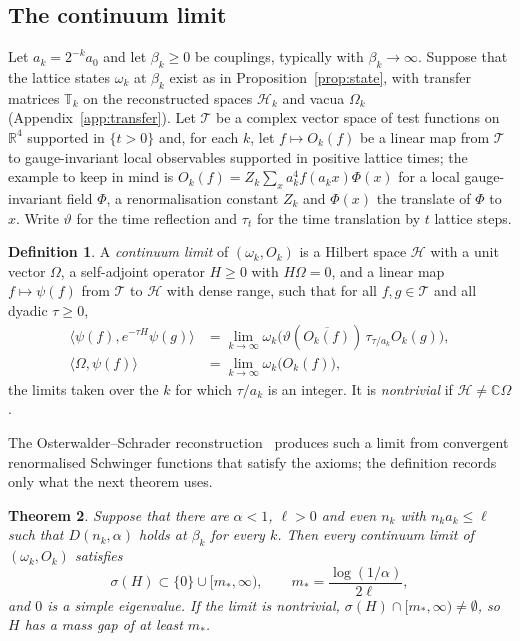 \documentclass[aps,prd,twocolumn,superscriptaddress,nofootinbib,longbibliography,floatfix,amsmath,amssymb,10pt]{revtex4-2}
\newtheorem{theorem}{Theorem}
\theoremstyle{definition}
\newtheorem{definition}[theorem]{Definition}
\theoremstyle{remark}
\newcommand{\R}{\mathbb{R}}
\newcommand{\C}{\mathbb{C}}
\newcommand{\ip}[2]{\langle #1,#2\rangle}
\begin{document}
\subsection{The continuum limit}

Let $a_k=2^{-k}a_0$ and let $\beta_k\ge0$ be couplings, typically with
$\beta_k\to\infty$. Suppose that the lattice states $\omega_k$ at $\beta_k$
exist as in Proposition~\ref{prop:state}, with transfer matrices $\mathbb T_k$ on
the reconstructed spaces $\mathcal H_k$ and vacua $\Omega_k$
(Appendix~\ref{app:transfer}). Let $\mathcal T$
be a complex vector space of test functions on $\R^4$ supported in $\{t>0\}$
and, for each $k$, let $f\mapsto O_k(f)$ be a linear map from $\mathcal T$ to
gauge-invariant local observables supported in positive lattice times; the
example to keep in mind is $O_k(f)=Z_k\sum_xa_k^4f(a_kx)\Phi(x)$ for a local
gauge-invariant field $\Phi$, a renormalisation constant $Z_k$ and $\Phi(x)$
the translate of $\Phi$ to $x$. Write $\vartheta$ for the time reflection and
$\tau_t$ for the time translation by $t$ lattice steps.

\begin{definition}\label{def:limit}
A \emph{continuum limit} of $(\omega_k,O_k)$ is a Hilbert space $\mathcal H$
with a unit vector $\Omega$, a self-adjoint operator $H\ge0$ with
$H\Omega=0$, and a linear map $f\mapsto\psi(f)$ from $\mathcal T$ to
$\mathcal H$ with dense range, such that for all $f,g\in\mathcal T$ and all
dyadic $\tau\ge0$,
\[
\begin{split}
\ip{\psi(f)}{e^{-\tau H}\psi(g)}&=\lim_{k\to\infty}\omega_k\bigl(\vartheta
(\overline{O_k(f)})\,\tau_{\tau/a_k}O_k(g)\bigr),\\
\ip\Omega{\psi(f)}&=\lim_{k\to\infty}\omega_k\bigl(O_k(f)\bigr),
\end{split}
\]
the limits taken over the $k$ for which $\tau/a_k$ is an integer. It is
\emph{nontrivial} if $\mathcal H\ne\C\Omega$.
\end{definition}

The Osterwalder--Schrader reconstruction~\cite{OS73,OS75} produces such a
limit from convergent renormalised Schwinger functions that satisfy the
axioms; the definition records only what the next theorem uses.

\begin{theorem}\label{thm:transfer}
Suppose that there are $\alpha<1$, $\ell>0$ and even $n_k$ with
$n_ka_k\le\ell$ such that $D(n_k,\alpha)$ holds at $\beta_k$ for every $k$.
Then every continuum limit of $(\omega_k,O_k)$ satisfies
\[
\sigma(H)\subset\{0\}\cup[m_*,\infty),\qquad m_*=\frac{\log(1/\alpha)}{2\ell},
\]
and $0$ is a simple eigenvalue. If the limit is nontrivial,
$\sigma(H)\cap[m_*,\infty)\ne\emptyset$, so $H$ has a mass gap of at least
$m_*$.
\end{theorem}
\end{document}
